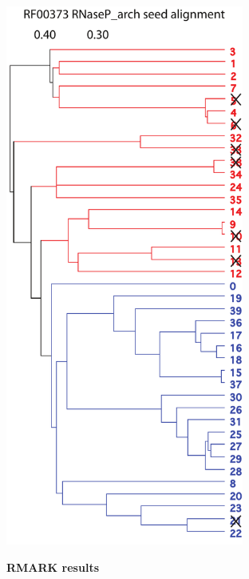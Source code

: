 \documentclass[landscape]{slides}
\begin{document}
\begin{slide}
\begin{minipage}{3.5in}
\begin{center}
\includegraphics[height=7in]{figs/u8-RF00373-tree}

\end{center}
\end{minipage}
\end{slide}
\begin{slide}
\begin{center}
\large
\textbf{RMARK results}
\end{center}
\medskip


\vfill 
\end{slide}
\end{document}
